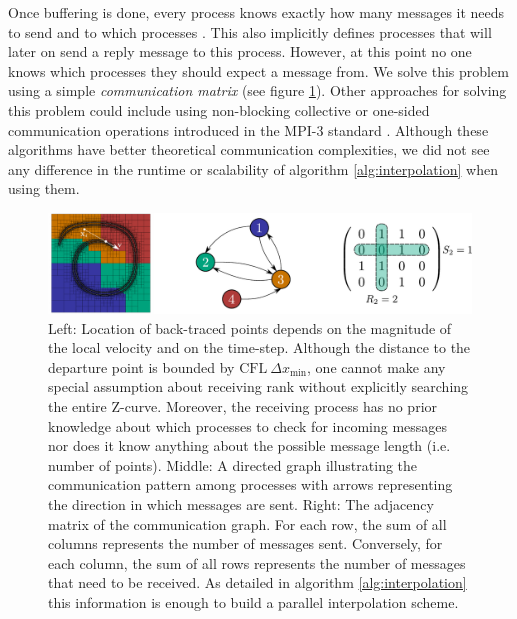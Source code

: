 Once buffering is done, every process knows exactly how many messages it needs to send and to which processes . This also implicitly defines processes that will later on send a reply message to this process. However, at this point no one knows which processes they should expect a message from. We solve this problem using a simple \textit{communication matrix} (see figure \ref{fig:communication}). Other approaches for solving this problem could include using non-blocking collective or one-sided communication operations introduced in the MPI-3 standard \cite{MPI_ref, sparse dynamic exchange protocol paper}. Although these algorithms have better theoretical communication complexities, we did not see any difference in the runtime or scalability of algorithm \ref{alg:interpolation} when using them. 

\begin{figure}[htbp]
\begin{center}
\includegraphics[width = \textwidth] {figures/communication.pdf}
\end{center}
\caption{Left: Location of back-traced points depends on the magnitude of the local velocity and on the time-step. Although the distance to the departure point is bounded by $\text{CFL} \: \Delta x_{\min}$, one cannot make any special assumption about receiving rank without explicitly searching the entire Z-curve. Moreover, the receiving process has no prior knowledge about which processes to check for incoming messages nor does it know anything about the possible message length (i.e. number of points). Middle: A directed graph illustrating the communication pattern among processes with arrows representing the direction in which messages are sent. Right: The adjacency matrix of the communication graph. For each row, the sum of all columns represents the number of messages sent. Conversely, for each column, the sum of all rows represents the number of messages that need to be received. As detailed in algorithm \ref{alg:interpolation} this information is enough to build a parallel interpolation scheme.}
\label{fig:communication}
\end{figure}

